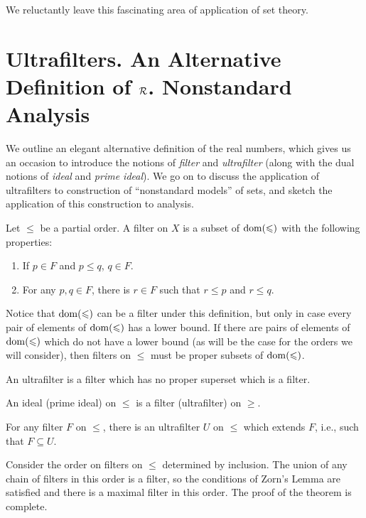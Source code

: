 We reluctantly leave this fascinating area of application of set theory.



\section[Ultrafilters]{Ultrafilters. An Alternative Definition of 
$\cal R$.
Nonstandard Analysis}

We outline an elegant alternative definition of the real numbers, 
which gives us an occasion to introduce the notions of {\itshape filter\/}
and {\itshape ultrafilter\/} (along with the dual notions of {\itshape ideal\/}
and {\itshape prime ideal\/}).  We go on to discuss the application of
ultrafilters to construction of ``nonstandard models'' of sets, and
sketch the application of this construction to analysis.

\begin{definition}
 Let $\leq$ be a partial order.  A {\upshape
 filter on $X$} is a subset of $\mathop{\mathrm{dom}}(\leqslant)$ with the
 following properties:
 \begin{enumerate}
  \item  If $p \in F$ and $p \leq q$, $q \in F$.
  \item For any $p,q \in F$, there is $r \in F$ such that $r \leq p$ and $r
    \leq q$.
 \end{enumerate}

 Notice that $\mathop{\mathrm{dom}}(\leqslant)$ can be a filter under this definition, but
 only in case every pair of elements of $\mathop{\mathrm{dom}}(\leqslant)$ has a lower bound.
 If there are pairs of elements of $\mathop{\mathrm{dom}}(\leqslant)$ which do not have a
 lower bound (as will be the case for the orders we will consider),
 then filters on $\leq$ must be proper subsets of $\mathop{\mathrm{dom}}(\leqslant)$.

 An {\upshape ultrafilter} is a filter which has no
 proper superset which is a filter.

 An {\upshape ideal (prime ideal)} on $\leq$ is a filter (ultrafilter) on
 $\geq$.
\end{definition}

\begin{thm}
 For any filter $F$ on $\leq$, there is an ultrafilter $U$
 on $\leq$ which extends $F$, i.e., such that $F \subseteq U$.
\end{thm}

\preuve Consider the order on filters on $\leq$
determined by inclusion.  The union of any chain of filters in
this order is a filter, so the conditions of Zorn's Lemma
are satisfied and there is a maximal filter in this order.  The proof of the
theorem is complete.
\finpreuve

